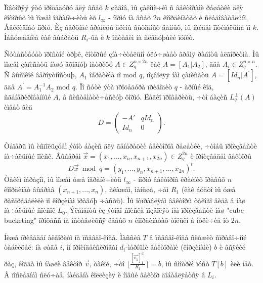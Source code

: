 \documentclass[a4paper,12pt]{article}
\begin{document}
Ïîâòîðÿÿ ýòó ïðîöåäóðó äëÿ âñåõ $k$ øàãîâ, ìû çàêîíè÷èì ñ âåêòîðàìè ðåøåòêè äëÿ êîòîðûõ ìû ìîæåì îãðàíè÷èòü èõ $l_{\infty}$ - íîðìó íà âñåõ $2n$ êîîðäèíàòàõ è ñëåäîâàòåëüíî, Åâêëèäîâó íîðìó. Èç âåðõíåé ãðàíèöû äëèíû âûõîäíûõ äàííûõ, ìû íàéäåì îïòèìàëüíîå ïî $k$. Îáñóæäåíèå êàê âûáðàòü $R_i$-ûå è $k$ îñòàâèì íà ñëåäóþùèé ïóíêò.

Ñóùåñòâóåò ïðîñòîé òðþê, êîòîðûé çíà÷èòåëüíî óëó÷øàåò âðåìÿ ðàáîòû àëãîðèòìà. Ìû ìîæåì çàïèñàòü íàøó âõîäíóþ ìàòðèöó $A \in Z_q^{n \times 2n}$ êàê $A = [A_1 | A_2]$, ãäå $A_i \in Z_q^{n \times n}$. Ñ âûñîêîé âåðîÿòíîñòüþ, $A_1$ îáðàòèìà ïî mod $q$, ïîçâîëÿÿ íàì çàïèñàòü $A = [Id_n | A^{'}]$, ãäå $A^{'} = A^{-1}_1 A_2$ mod $q$. Ïî ñóòè ýòà ïðîöåäóðà ïðèâîäèò $q$ - àðíûé êîä, ñãåíåðèðîâàííûé $A$, â ñèñòåìàòè÷åñêóþ ôîðìó. Ëåãêî ïðîâåðèòü, ÷òî áàçèñ $L^{\perp}_q (A)$ èìååò âèä 
\begin{equation} \label{eq:BasisD}
	D = \begin{pmatrix}
	-A' & q Id_n \\
	Id_{n} & 0
	\end{pmatrix}.
\end{equation}

Òåïåðü ìû èñïîëüçóåì ýòîò áàçèñ äëÿ ãåíåðàöèè âåêòîðîâ ðåøåòêè, ÷òîáû ïðîèçâåñòè íà÷àëüíûé ïîèñê. Âûáåðåì $\vec{x}  = (x_1, \ldots, x_n, x_{n+1}, x_{2n}) \in Z_q^{2n}$ è ïðîèçâåäåì âåêòîðû
\[
D \vec{x} \bmod q = (y_1,  \ldots,  y_n,  x_{n+1}, \ldots, x_{2n})^{t}.
\]
Òàêèì îáðàçîì, ìû ìîæåì óæå îãðàíè÷èòü $l_{\infty}$ - íîðìó âåêòîðîâ êðàéíèõ ïðàâûõ $n$ êîîðäèíàò âûáðàâ $(x_{n+1},...,x_n)$, ñêàæåì, ìåíüøå, ÷åì $R_1$ (êàê áóäòî ìû óæå ðàñïðåäåëèëè ïî êîðçèíàì ïðàâóþ ÷àñòü). Ìû îòïðàâëÿåì âåêòîðû òàêîãî âèäà â íàø íà÷àëüíûé ñïèñîê $L_0$. Ýëåìåíòû èç ýòîãî ñïèñêà ïîçâîëÿò íàì ïðîèçâåñòè íàø "cube-bucketing" ïðîöåññ íà îñòàâøèõñÿ ëåâûõ $n$ êîîðäèíàòàõ òîëüêî â îòëè÷èå îò $2n$.

Íèæå ïðèâåäåí àëãîðèòì íà ïñåâäî-êîäå. Ìàññèâ $T$ â ïñåâäî-êîäå ñëóæèò ñïðàâî÷íîé òàáëèöåé: íà øàãå $i$, îí ïðîèíäåêñèðîâàí $d_i$-ìåðíûìè âåêòîðàìè (êîðçèíàìè) $b$ è âñÿêèé ðàç, êîãäà ìû íàøëè âåêòîð $\vec{v}$, òàêîé, ÷òî $\Big\lfloor \frac{[\vec{v_1}]_1^{d_1}}{R_1} \Big\rceil = b$, ìû ñìîòðèì ïóñò $T[b]$ èëè íåò. Â ïîñëåäíåì ñëó÷àå, íàéäåíà êîëëèçèÿ è íîâûé âåêòîð äîáàâëÿåòñÿ â $L_i$.
\end{document}

